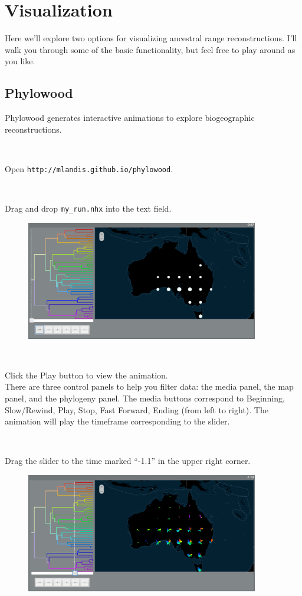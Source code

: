 \documentclass[11pt]{article}
\newcommand{\impmark}{\strut\vadjust{\domark}}
\newcommand{\domark}{%
  \vbox to 0pt{
    \kern-\dp\strutbox
    \smash{\llap{$\rightarrow$\kern1em}}
    \vss
  }%
}
\begin{document}
\section{Visualization}

Here we'll explore two options for visualizing ancestral range reconstructions.
I'll walk you through some of the basic functionality, but feel free to play around as you like.

\subsection{Phylowood}

Phylowood generates interactive animations to explore biogeographic reconstructions.

\noindent \\ \impmark Open \texttt{http://mlandis.github.io/phylowood}.

\noindent \\ \impmark Drag and drop \texttt{my\_run.nhx} into the text field.

\begin{figure}[H]
\centering
\includegraphics[width=4in]{figures/phw_mrca}
\end{figure}

\noindent \\ \impmark Click the Play button to view the animation. \\

There are three control panels to help you filter data: the media panel, the map panel, and the phylogeny panel.
The media buttons correspond to Beginning, Slow/Rewind, Play, Stop, Fast Forward, Ending (from left to right).
The animation will play the timeframe corresponding to the slider.

\noindent \\ \impmark Drag the slider to the time marked ``-1.1'' in the upper right corner.

\begin{figure}[H]
\centering
\includegraphics[width=4in]{figures/phw_1_1ma}
\end{figure}
\end{document}
